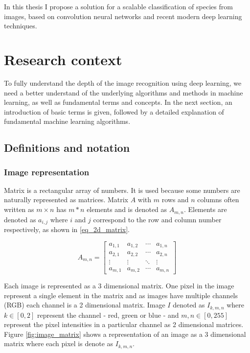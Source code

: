\documentclass[times, utf8, diplomski]{fer}
\begin{document}
In this thesis I propose a solution for a scalable classification of species from images, based on convolution neural networks and recent modern deep learning techniques.

\chapter{Research context}
To fully understand the depth of the image recognition using deep learning, we need a better understand of the underlying algorithms and methods in machine learning, as well as fundamental terms and concepts. In the next section, an introduction of basic terms is given, followed by a detailed explanation of fundamental machine learning algorithms.

\section{Definitions and notation}

\subsection{Image representation}
Matrix is a rectangular array of numbers. It is used because some numbers are naturally represented as matrices. Matrix $A$ with $m$ rows and $n$ columns often written as $m \times n$ has $m*n$ elements and is denoted as $A_{m,n}$. Elements are denoted as $a_{i,j}$ where $i$ and $j$ correspond to the row and column number respectively, as shown in \ref{eq_2d_matrix}. 

\begin{equation} \label{eq_2d_matrix}
A_{m,n} = 
 \begin{bmatrix}
  a_{1,1} & a_{1,2} & \cdots & a_{1,n} \\
  a_{2,1} & a_{2,2} & \cdots & a_{2,n} \\
  \vdots  & \vdots  & \ddots & \vdots  \\
  a_{m,1} & a_{m,2} & \cdots & a_{m,n} 
 \end{bmatrix}
\end{equation}


Each image is represented as a 3 dimensional matrix. One pixel in the image represent a single element in the matrix and as images have multiple channels (RGB) each channel is a 2 dimensional matrix. Image $I$ denoted as $I_{k,m,n}$ where $k\in[0,2]$ represent the channel - red, green or blue - and $m,n\in[0,255]$ represent the pixel intensities in a particular channel as 2 dimensional matrices. Figure \ref{fig:image_matrix} shows a representation of an image as a 3 dimensional matrix where each pixel is denote as $I_{k,m,n}$.
\end{document}
